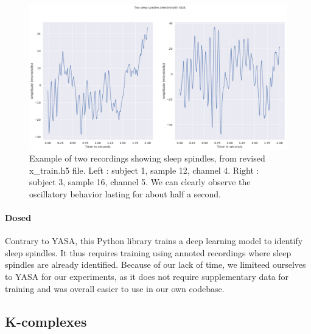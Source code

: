 \begin{figure}
	\includegraphics[width=\textwidth]{images/spindles_example.png}
	\caption{Example of two recordings showing sleep spindles, from revised x\_train.h5 file. Left : subject 1, sample 12, channel 4. Right : subject 3, sample 16, channel 5. We can clearly observe the oscillatory behavior lasting for about half a second.}
	\label{fig:spindles}
\end{figure}


\paragraph{Dosed} Contrary to YASA, this Python library trains a deep learning model to identify sleep spindles. It thus requires training using annoted recordings where sleep spindles are already identified.
Because of our lack of time, we limiteed ourselves to YASA for our experiments, as it does not require supplementary data for training and was overall easier to use in our own codebase. 



\subsection{K-complexes}